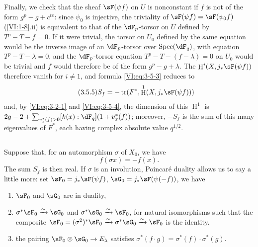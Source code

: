 \documentclass[oneside]{book}
\DeclareMathOperator{\h}{H}
\DeclareMathOperator{\spec}{Spec}
\DeclareMathOperator{\tr}{tr}
\newcommand{\iso}{\xrightarrow\sim}
\theoremstyle{sga-source}
\theoremstyle{sga-source-dash}
\theoremstyle{sga-source-dotdash}
\theoremstyle{sga-source-number-note-dash}
\theoremstyle{sga-source-note-number-dotdash}
\theoremstyle{sga-source-example-dotdash}
\theoremstyle{sga-source-inline-number}
\theoremstyle{sga-source-bare-number}
\theoremstyle{sga-source}
\newcommand{\PrintPage}[1]{}\newcommand{\MathPage}[1]{}\newcommand{\PrintCite}[2]{#1}\newcommand{\var}[3]{#2}
\begin{document}
Finally, we check that the sheaf $\sF(\psi f)$ on $U$ is nonconstant if 
$f$ is not of the form $g^p-g+c^{t e}$: since $\psi_0$ is injective, the 
triviality of $\sF(\psi f)=\sF(\psi_0 f)$ (\ref{VI:1-8}.ii) is equivalent to 
\var{that of the $\dF_q$-torsor}{that of the $\dF_p$-torsor}{S45-SOL-0771} on $U$ defined by $T^p-T-f=0$. If it were trivial, 
the torsor on $U_0$ defined by the same equation \PrintPage{192}
would be the inverse image of an 
\var{$\dF_q$-torsor over $\spec(\dF_q)$}{$\dF_p$-torsor over $\spec(\dF_q)$}{S45-SOL-0773}, with equation $T^p-T-\lambda=0$, and the 
$\dF_p$-torsor equation $T^p-T-(f-\lambda)=0$ on $U_0$ would be trivial 
and $f$ would therefore be of the form $g^p-g+\lambda$. The 
$\h^i(X,j_\ast \sF(\psi f))$ therefore vanish for $i\ne 1$, and formula 
\eqref{VI:eq:3-5-3} reduces to 
\begin{equation*}\tag{3.5.5}\label{VI:eq:3-5-5}
  S_f = -\tr(F^\ast,\h^1(X,j_\ast \sF(\psi f))) 
\end{equation*}
and, by \eqref{VI:eq:3-2-1} and \eqref{VI:eq:3-5-4}, the dimension of this $\h^1$ is 
$2 g-2+\sum_{v_x^\ast(f)>0} [k(x):\dF_q](1+v_x^\ast(f))$; moreover, $-S_f$ 
is the sum of this many eigenvalues of $F^\ast$, each having complex 
absolute value $q^{1/2}$. 





\subsection{}\label{VI:3-6}

Suppose that, for an automorphism $\sigma$ of $X_0$, we have 
\[
  f(\sigma x) = - f(x) \text{.} 
\]
The sum $S_f$ is then real. If $\sigma$ is an involution, Poincaré 
duality allows us to say a little more: set 
$\sF_0=j_\ast \sF(\psi f)$, $\sG_0 = j_\ast \sF(\psi(-f))$, we have 
\begin{enumerate}[\indent a)]
  \item $\sF_0$ and $\sG_0$ are in duality, 
  \item $\sigma^\ast \sF_0 \iso \sG_0$ and $\sigma^\ast \sG_0 \iso \sF_0$, for 
    natural isomorphisms such that the composite 
    $\sF_0=(\sigma^2)^\ast \sF_0 \iso \sigma^\ast \sG_0 \iso \sF_0$ 
    is the identity. 
  \item the pairing $\sF_0\otimes \sG_0 \to E_\lambda$ satisfies 
    $\sigma^\ast(f\cdot g) = \sigma^\ast(f) \cdot \sigma^\ast (g)$. 
\end{enumerate} 
\end{document}
